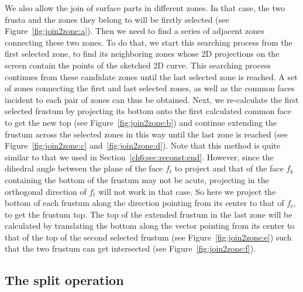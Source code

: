 We also allow  the join of surface parts in different zones. In that
case, the two frusta and the zones they belong to will be firstly
selected (see Figure~\ref{fig:join2zone:a}). Then we need to find a
series of adjacent zones connecting these two zones. To do that, we
start this searching process from the first selected zone, to find
its neighboring zones whose 2D projections on the screen contain the
points of the sketched 2D curve. This searching process continues
from these candidate zones until the last selected zone is reached.
A set of zones connecting the first and last selected zones, as well
as the common faces incident to each pair of zones can thus be
obtained. Next, we re-calculate the first selected frustum by
projecting its bottom onto the first calculated common face to get
the new top (see Figure~\ref{fig:join2zone:b}) and continue
extending the frustum across the selected zones in this way until
the last zone is reached (see Figure~\ref{fig:join2zone:c}
and~\ref{fig:join2zone:d}). Note that this method is quite similar
to that we used in Section~\ref{ch6:sec:reconst:end}. However, since
the dihedral angle between the plane of the face $f_t$ to project
and that of the face $f_b$ containing the bottom of the frustum may
not be acute, projecting in the orthogonal direction of $f_t$ will
not work in that case. So here we project the bottom of each frustum
along the direction pointing from its center to that of $f_t$, to
get the frustum top. The top of the extended frustum in the last
zone will be calculated by translating the bottom along the vector
pointing from its center to that of the top of the second selected
frustum (see Figure~\ref{fig:join2zone:e}) such that the two frustum
can get intersected (see Figure~\ref{fig:join2zone:f}).





\subsection{The split operation}
\label{ch6:sec:edit:split}

